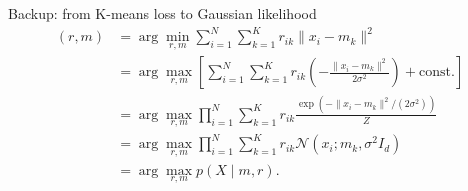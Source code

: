\documentclass[aspectratio=169,10pt]{beamer}
\newcommand{\slidelabel}{SSBI}
\begin{document}
\begin{frame}{Backup: from K-means loss to Gaussian likelihood}
  \small\setlength{\abovedisplayskip}{2pt}\setlength{\belowdisplayskip}{2pt}\setlength{\jot}{1pt}
  \begin{align*}
    (r,m)
    &=\arg\min_{r,m}\sum_{i=1}^{N}\sum_{k=1}^{K}r_{ik}\lVert x_i-m_k\rVert^2\\[1mm]
    &=\arg\max_{r,m}\left[\sum_{i=1}^{N}\sum_{k=1}^{K}r_{ik}
       \left(-\frac{\lVert x_i-m_k\rVert^2}{2\sigma^2}\right)+\mathrm{const.}\right]\\[1mm]
    &=\arg\max_{r,m}\prod_{i=1}^{N}\sum_{k=1}^{K}r_{ik}
       \frac{\exp\!\left(-\lVert x_i-m_k\rVert^2/(2\sigma^2)\right)}{Z}\\[1mm]
    &=\arg\max_{r,m}\prod_{i=1}^{N}\sum_{k=1}^{K}r_{ik}\mathcal{N}(x_i;m_k,\sigma^2 I_d)\\[1mm]
    &=\arg\max_{r,m}p(X\mid m,r).
  \end{align*}
\end{frame}

\renewcommand{\slidelabel}{SSBI · Task 4 · Backup}
\end{document}
